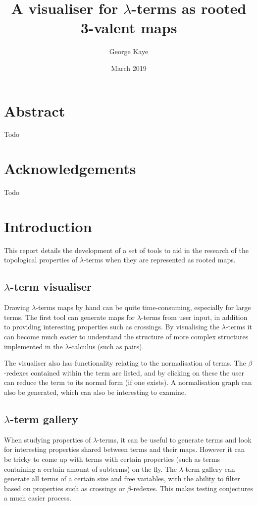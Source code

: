 \documentclass[11pt]{article}
\title{A visualiser for $\lambda$-terms as rooted 3-valent maps}
\author{George Kaye}
\date{March 2019}
\begin{document}


\tableofcontents

\newpage

\section{Abstract}
\label{sec:abstract}
Todo

\newpage

\section{Acknowledgements}
\label{sec:acks}
Todo


\newpage

\section{Introduction}
\label{sec:intro}

This report details the development of a set of tools to aid in the research of the topological properties of $\lambda$-terms when they are represented as rooted maps.

\subsection{\texorpdfstring{$\lambda$}{lambda}-term visualiser}

Drawing $\lambda$-terms maps by hand can be quite time-consuming, especially for large terms. The first tool can generate maps for $\lambda$-terms from user input, in addition to providing interesting properties such as crossings. By visualising the $\lambda$-terms it can become much easier to understand the structure of more complex structures implemented in the $\lambda$-calculus (such as pairs).

The visualiser also has functionality relating to the normalisation of terms. The $\beta$-redexes contained within the term are listed, and by clicking on these the user can reduce the term to its normal form (if one exists). A normalisation graph can also be generated, which can also be interesting to examine.

\subsection{\texorpdfstring{$\lambda$}{lambda}-term gallery}
When studying properties of $\lambda$-terms, it can be useful to generate terms and look for interesting properties shared between terms and their maps. However it can be tricky to come up with terms with certain properties (such as terms containing a certain amount of subterms) on the fly. The $\lambda$-term gallery can generate all terms of a certain size and free variables, with the ability to filter based on properties such as crossings or $\beta$-redexes. This makes testing conjectures a much easier process.
\end{document}
